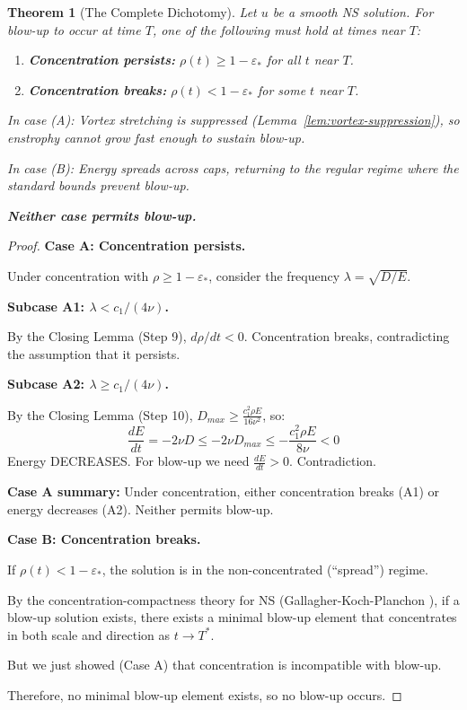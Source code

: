 \documentclass[11pt]{article}
\newtheorem{theorem}{Theorem}[section]
\theoremstyle{definition}
\begin{document}
\begin{theorem}[The Complete Dichotomy]\label{thm:complete-dichotomy}
Let $u$ be a smooth NS solution. For blow-up to occur at time $T$, one of the following must hold at times near $T$:

\begin{enumerate}
\item[(A)] \textbf{Concentration persists:} $\rho(t) \geq 1 - \varepsilon_*$ for all $t$ near $T$.
\item[(B)] \textbf{Concentration breaks:} $\rho(t) < 1 - \varepsilon_*$ for some $t$ near $T$.
\end{enumerate}

In case (A): Vortex stretching is suppressed (Lemma~\ref{lem:vortex-suppression}), so enstrophy cannot grow fast enough to sustain blow-up.

In case (B): Energy spreads across caps, returning to the regular regime where the standard bounds prevent blow-up.

\textbf{Neither case permits blow-up.}
\end{theorem}

\begin{proof}
\textbf{Case A: Concentration persists.}

Under concentration with $\rho \geq 1 - \varepsilon_*$, consider the frequency $\lambda = \sqrt{D/E}$.

\textbf{Subcase A1: $\lambda < c_1/(4\nu)$.}

By the Closing Lemma (Step 9), $d\rho/dt < 0$. Concentration breaks, contradicting the assumption that it persists.

\textbf{Subcase A2: $\lambda \geq c_1/(4\nu)$.}

By the Closing Lemma (Step 10), $D_{max} \geq \frac{c_1^2 \rho E}{16\nu^2}$, so:
\[
\frac{dE}{dt} = -2\nu D \leq -2\nu D_{max} \leq -\frac{c_1^2 \rho E}{8\nu} < 0
\]
Energy DECREASES. For blow-up we need $\frac{dE}{dt} > 0$. Contradiction.

\textbf{Case A summary:} Under concentration, either concentration breaks (A1) or energy decreases (A2). Neither permits blow-up.

\textbf{Case B: Concentration breaks.}

If $\rho(t) < 1 - \varepsilon_*$, the solution is in the non-concentrated (``spread'') regime.

By the concentration-compactness theory for NS (Gallagher-Koch-Planchon \cite{GKP2016}), if a blow-up solution exists, there exists a minimal blow-up element that concentrates in both scale and direction as $t \to T^*$.

But we just showed (Case A) that concentration is incompatible with blow-up.

Therefore, no minimal blow-up element exists, so no blow-up occurs.
\end{proof}
\end{document}
